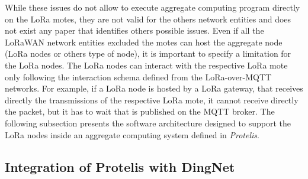 While these issues do not allow to execute aggregate computing program directly on the LoRa motes, they are not valid for the others network entities and does not exist any paper that identifies others possible issues.
Even if all the LoRaWAN network entities excluded the motes can host the aggregate node (LoRa nodes or others type of node), it is important to specify a limitation for the LoRa nodes. 
The LoRa nodes can interact with the respective LoRa mote only following the interaction schema defined from the LoRa-over-MQTT networks. 
For example, if a LoRa node is hosted by a LoRa gateway, that receives directly the transmissions of the respective LoRa mote, it cannot receive directly the packet, but it has to wait that is published on the MQTT broker.
The following subsection presents the software architecture designed to support the LoRa nodes inside an aggregate computing system defined in \textit{Protelis}.  

\subsection{Integration of Protelis with DingNet}


